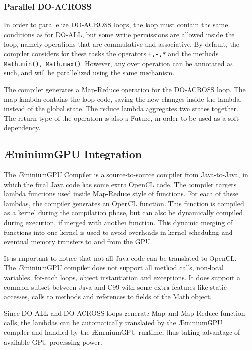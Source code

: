 \documentclass[smallextended]{svjour3}
\begin{document}
\subsubsection{Parallel DO-ACROSS}

In order to parallelize DO-ACROSS loops, the loop must contain the same conditions as for DO-ALL, but some write permissions are allowed inside the loop, namely operations that are commutative and associative. By default, the compiler considers for these tasks the operators \lstinline|+,-,*| and the methods \lstinline|Math.min(), Math.max()|. However, any over operation can be annotated as such, and will be parallelized using the same mechanism.

The compiler generates a Map-Reduce operation for the DO-ACROSS loop. The map lambda contains the loop code, saving the new changes inside the lambda, instead of the global state. The reduce lambda aggregates two states together. The return type of the operation is also a Future, in order to be used as a soft dependency.


\subsection{ÆminiumGPU Integration}

The ÆminiumGPU Compiler is a source-to-source compiler from Java-to-Java, in which the final Java code has some extra OpenCL code. The compiler targets lambda functions used inside Map-Reduce style of functions. For each of these lambdas, the compiler generates an OpenCL function. This function is compiled as a kernel during the compilation phase, but can also be dynamically compiled during execution, if merged with another function. This dynamic merging of functions into one kernel is used to avoid overheads in kernel scheduling and eventual memory transfers to and from the GPU.

It is important to notice that not all Java code can be translated to OpenCL. The ÆminiumGPU compiler does not support all method calls, non-local variables, for-each loops, object instantiation and exceptions. It does support a common subset between Java and C99 with some extra features like static accesses, calls to methods and references to fields of the Math object. 

Since DO-ALL and DO-ACROSS loops generate Map and Map-Reduce function calls, the lambdas can be automatically translated by the ÆminiumGPU compiler and handled by the ÆminiumGPU runtime, thus taking advantage of available GPU processing power.
\end{document}
